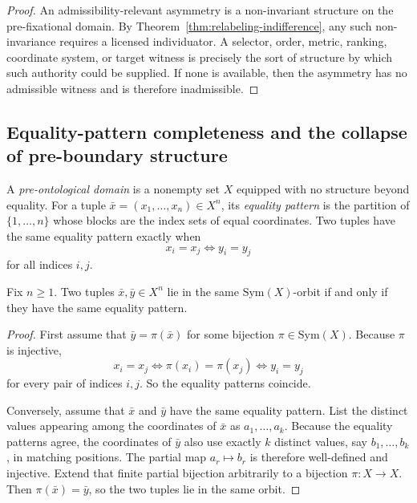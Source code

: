 \begin{proof}
An admissibility-relevant asymmetry is a non-invariant structure on the pre-fixational domain. By Theorem~\ref{thm:relabeling-indifference}, any such non-invariance requires a licensed individuator. A selector, order, metric, ranking, coordinate system, or target witness is precisely the sort of structure by which such authority could be supplied. If none is available, then the asymmetry has no admissible witness and is therefore inadmissible.\cite{MaleyAMetric,MaleyNecessity}
\end{proof}

\subsection{Equality-pattern completeness and the collapse of pre-boundary structure}

\begin{definition}
A \emph{pre-ontological domain} is a nonempty set $X$ equipped with no structure beyond equality. For a tuple $\bar x=(x_1,\dots,x_n)\in X^n$, its \emph{equality pattern} is the partition of $\{1,\dots,n\}$ whose blocks are the index sets of equal coordinates. Two tuples have the same equality pattern exactly when
\[
  x_i=x_j \iff y_i=y_j
\]
for all indices $i,j$.
\end{definition}

\begin{lemma}
\label{lem:orbit-classification-equality-pattern}
Fix $n\ge 1$. Two tuples $\bar x,\bar y\in X^n$ lie in the same $\mathrm{Sym}(X)$-orbit if and only if they have the same equality pattern.
\end{lemma}

\begin{proof}
First assume that $\bar y=\pi(\bar x)$ for some bijection $\pi\in \mathrm{Sym}(X)$. Because $\pi$ is injective,
\[
  x_i=x_j \iff \pi(x_i)=\pi(x_j) \iff y_i=y_j
\]
for every pair of indices $i,j$. So the equality patterns coincide.

Conversely, assume that $\bar x$ and $\bar y$ have the same equality pattern. List the distinct values appearing among the coordinates of $\bar x$ as $a_1,\dots,a_k$. Because the equality patterns agree, the coordinates of $\bar y$ also use exactly $k$ distinct values, say $b_1,\dots,b_k$, in matching positions. The partial map $a_r\mapsto b_r$ is therefore well-defined and injective. Extend that finite partial bijection arbitrarily to a bijection $\pi:X\to X$. Then $\pi(\bar x)=\bar y$, so the two tuples lie in the same orbit.\cite{MaleyAMetric,MaleyNecessity}
\end{proof}

